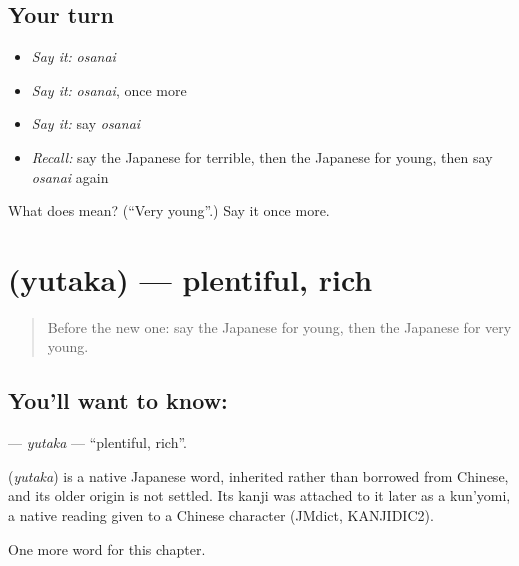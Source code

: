 \subsection*{Your turn}
\begin{itemize}
\raggedright
  \item \emph{Say it:} \emph{osanai}
  \item \emph{Say it:} \emph{osanai}, once more
  \item \emph{Say it:} say \emph{osanai}
  \item \emph{Recall:} say the Japanese for terrible, then the Japanese for young, then say \emph{osanai} again
\end{itemize}

\begin{tcolorbox}[breakable,colback=teal!4,colframe=teal!35!black,title={Before you move on}]
What does  mean? (\textquotedblleft{}Very young\textquotedblright{}.) Say it once more.
\end{tcolorbox}
\section[\texorpdfstring{\ja{ゆたか} (yutaka)}{ゆたか (yutaka)}]{ (yutaka) — plentiful, rich}

\label{lesson:JA-C125-yutaka}



\begin{quote}
Before the new one: say the Japanese for young, then the Japanese for very young.
\end{quote}

\subsection*{You'll want to know: }
\textbf{} — \emph{yutaka} — \textquotedblleft{}plentiful, rich\textquotedblright{}.

\begin{cousinweb}
\textbf{} (\emph{yutaka}) is a native Japanese word, inherited rather than borrowed from Chinese, and its older origin is not settled. Its kanji was attached to it later as a kun'yomi, a native reading given to a Chinese character (JMdict, KANJIDIC2).
\end{cousinweb}

\begin{grammarlens}[title={What you've built}]
One more word for this chapter.
\end{grammarlens}

